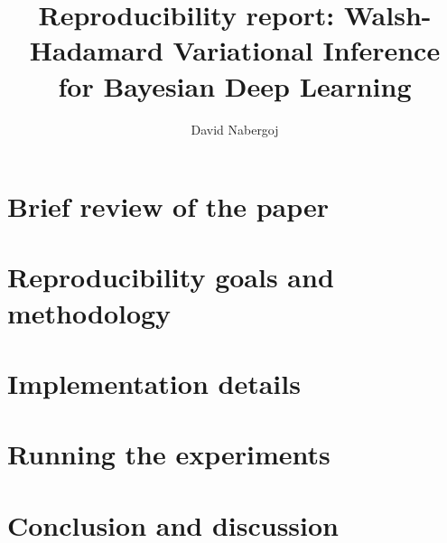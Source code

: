 \documentclass[11pt]{article}
\author{David Nabergoj}
\title{Reproducibility report: Walsh-Hadamard Variational Inference for Bayesian Deep Learning}
\begin{document}
    \maketitle
    
    \section{Brief review of the paper}\label{sec:brief-review-of-the-paper}

    \section{Reproducibility goals and methodology}\label{sec:reproducibility-goals}

    \section{Implementation details}\label{sec:implementation-details}
    
    \section{Running the experiments}\label{sec:running-the-experiments}
    
    \section{Conclusion and discussion}\label{sec:conclusion-and-discussion}
\end{document}
